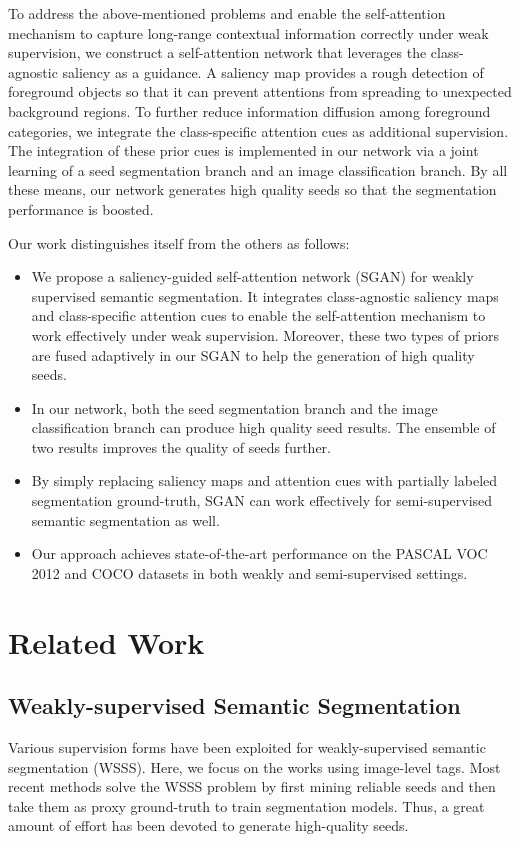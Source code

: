 \documentclass[journal]{IEEEtran}
\begin{document}
To address the above-mentioned problems and enable the self-attention mechanism to capture long-range contextual information correctly under weak supervision, we construct a self-attention network that leverages the class-agnostic saliency as a guidance. A saliency map provides a rough detection of foreground objects so that it can prevent attentions from spreading to unexpected background regions. To further reduce information diffusion among foreground categories, we integrate the class-specific attention cues as additional supervision. The integration of these prior cues is implemented in our network via a joint learning of a seed segmentation branch and an image classification branch. By all these means, our network generates high quality seeds so that the segmentation performance is boosted. 

Our work distinguishes itself from the others as follows:
\begin{itemize}
	\item We propose a saliency-guided self-attention network (SGAN) for weakly supervised semantic segmentation. It integrates class-agnostic saliency maps and class-specific attention cues to enable the self-attention mechanism to work effectively under weak supervision. Moreover, these two types of priors are fused adaptively in our SGAN to help the generation of high quality seeds. 
	\item In our network, both the seed segmentation branch and the image classification branch can produce high quality seed results. The ensemble of two results improves the quality of seeds further. 

	\item By simply replacing saliency maps and attention cues with partially labeled segmentation ground-truth, SGAN can work effectively for semi-supervised semantic segmentation as well. 

	\item Our approach achieves state-of-the-art performance on the PASCAL VOC 2012 and COCO datasets in both weakly and semi-supervised settings.
\end{itemize}

\section{Related Work}

\subsection{Weakly-supervised Semantic Segmentation}
Various supervision forms have been exploited for weakly-supervised semantic segmentation (WSSS). Here, we focus on the works using image-level tags. Most recent methods solve the WSSS problem by first mining reliable seeds and then take them as proxy ground-truth to train segmentation models. Thus, a great amount of effort has been devoted to generate high-quality seeds.
\end{document}
